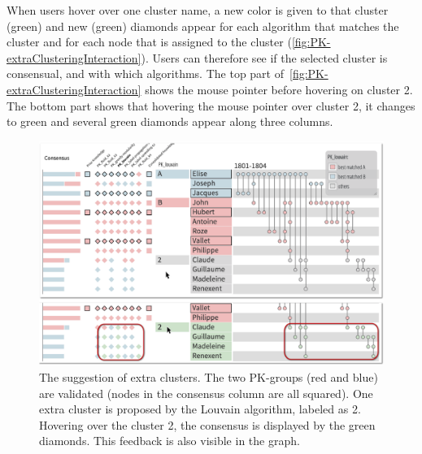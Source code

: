 When users hover over one cluster name, a new color is given to that cluster (\eg green) and new (green) diamonds appear for each algorithm that matches the cluster and for each node that is assigned to the cluster (\autoref{fig:PK-extraClusteringInteraction}).
Users can therefore see if the selected cluster is consensual, and with which algorithms. The top part of~\autoref{fig:PK-extraClusteringInteraction} shows the mouse pointer before hovering on cluster 2. The bottom part shows that hovering the mouse pointer over cluster 2, it changes to green and several green diamonds appear along three columns.


\begin{figure}[!ht]
\centering
\includegraphics[width=\linewidth]{static/figures/PK-Clustering/VISPaperFigures/Small-extraClusters-01.png}
\caption{The suggestion of extra clusters. The two PK-groups (red and blue) are validated (nodes in the consensus column are all squared). One extra cluster is proposed by the Louvain algorithm, labeled as 2. Hovering over the cluster 2, the consensus is displayed by the green diamonds. This feedback is also visible in the graph.}
\label{fig:PK-extraClusteringInteraction}
\end{figure}

